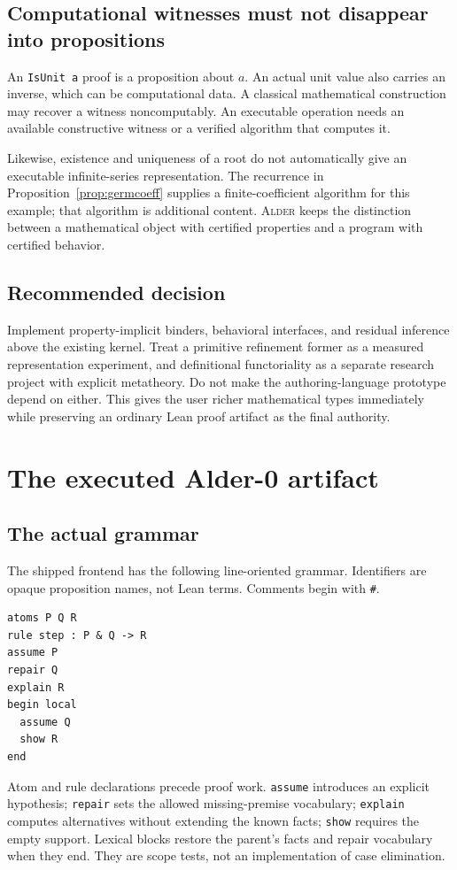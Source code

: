 \documentclass[11pt,a4paper]{article}
\newcommand{\code}[1]{\nolinkurl{#1}}
\newcommand{\Alder}{\textsc{Alder}}
\theoremstyle{plain}
\theoremstyle{definition}
\theoremstyle{remark}
\begin{document}
\subsection{Computational witnesses must not disappear into propositions}
An \code{IsUnit a} proof is a proposition about $a$. An actual unit value also carries an inverse, which can be computational data. A classical mathematical construction may recover a witness noncomputably. An executable operation needs an available constructive witness or a verified algorithm that computes it.

Likewise, existence and uniqueness of a root do not automatically give an executable infinite-series representation. The recurrence in Proposition~\ref{prop:germcoeff} supplies a finite-coefficient algorithm for this example; that algorithm is additional content. \Alder{} keeps the distinction between a mathematical object with certified properties and a program with certified behavior.

\subsection{Recommended decision}
Implement property-implicit binders, behavioral interfaces, and residual inference above the existing kernel. Treat a primitive refinement former as a measured representation experiment, and definitional functoriality as a separate research project with explicit metatheory. Do not make the authoring-language prototype depend on either. This gives the user richer mathematical types immediately while preserving an ordinary Lean proof artifact as the final authority.

\section{The executed Alder-0 artifact}\label{sec:executed}

\subsection{The actual grammar}
The shipped frontend has the following line-oriented grammar. Identifiers are opaque proposition names, not Lean terms. Comments begin with \texttt{\#}.
\Needspace{170pt}
\begin{lstlisting}
atoms P Q R
rule step : P & Q -> R
assume P
repair Q
explain R
begin local
  assume Q
  show R
end
\end{lstlisting}
Atom and rule declarations precede proof work. \code{assume} introduces an explicit hypothesis; \code{repair} sets the allowed missing-premise vocabulary; \code{explain} computes alternatives without extending the known facts; \code{show} requires the empty support. Lexical blocks restore the parent's facts and repair vocabulary when they end. They are scope tests, not an implementation of case elimination.
\end{document}
